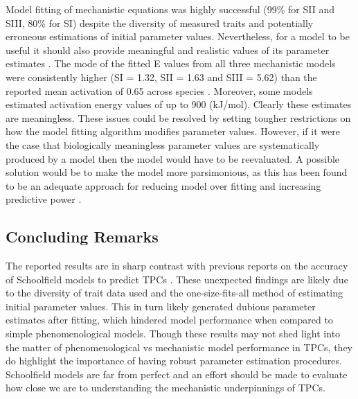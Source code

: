 \documentclass[11pt]{article}  %
\begin{document}
Model fitting of mechanistic equations was highly successful (99\% for SII and SIII, 80\% for SI) despite the diversity of measured traits and potentially erroneous estimations of initial parameter values. Nevertheless, for a model to be useful it should also provide meaningful and realistic values of its parameter estimates \cite{Levins}.  The mode of the fitted E values from all three mechanistic models were consistently higher (SI = 1.32, SII = 1.63 and SIII = 5.62) than the reported mean activation of 0.65 across species \cite{Brown}. Moreover, some models estimated activation energy values of up to 900 (kJ/mol). Clearly these estimates are meaningless. These issues could be resolved by setting tougher restrictions on how the model fitting algorithm modifies parameter values. However, if it were the case that biologically meaningless parameter values are systematically produced by a model then the model would have to be reevaluated. A possible solution would be to make the model more parsimonious, as this has been found to be an adequate approach for reducing model over fitting and increasing predictive power \cite{Cox}.

\subsection*{Concluding Remarks}

The reported results are in sharp contrast with previous reports on the accuracy of Schoolfield models to predict TPCs \cite{Padfield,Barneche}. These unexpected findings are likely due to the diversity of trait data used and the one-size-fits-all method of estimating initial parameter values. This in turn likely generated dubious parameter estimates after fitting, which hindered model performance when compared to simple phenomenological models. Though these results may not shed light into the matter of phenomenological vs mechanistic model performance in TPCs, they do highlight the importance of having robust parameter estimation procedures. Schoolfield models are far from perfect \cite{Kontopoulos} and an effort should be made to evaluate how close we are to understanding the mechanistic underpinnings of TPCs.  

\newpage



\end{document}
